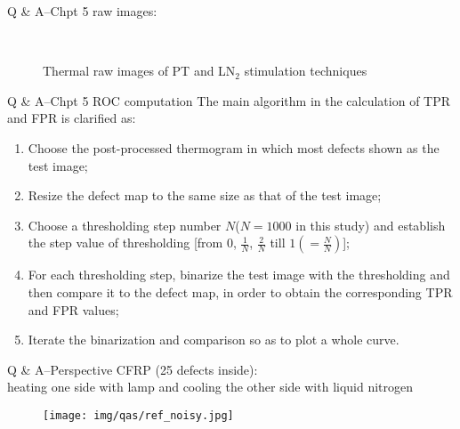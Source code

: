 \begin{frame}{Q \& A--Chpt 5 \small{raw images:}}
    \begin{figure}
     \vspace{-18pt}
       \\
       \vspace*{-10pt}
       \caption{Thermal raw images of PT and LN$_2$ stimulation techniques}      
    \end{figure}
\end{frame}


\begin{frame}{Q \& A--Chpt 5 \small{ROC computation}}
The main algorithm in the calculation of TPR and FPR is clarified as:
\begin{enumerate}
   \item Choose the post-processed thermogram in which most defects shown as the test image;
   \item Resize the defect map to the same size as that of the test image;
   \item Choose a thresholding step number $N$($N=1000$ in this study) and establish the step value of thresholding [from $0$, $\frac{1}{N}$, $\frac{2}{N}$ till $1 (=\frac{N}{N})$];
   \item For each thresholding step, binarize the test image with the thresholding and then compare it to the defect map, in order to obtain the corresponding TPR and FPR values;
   \item Iterate the binarization and comparison so as to plot a whole curve.
\end{enumerate}
\end{frame}


\begin{frame}{Q \& A--\small{Perspective}}
CFRP (25 defects inside):\\
heating one side with lamp and cooling the other side with liquid nitrogen 
  \begin{figure}
    \centering
    \texttt{[image: img/qas/ref\_noisy.jpg]}
  \end{figure}

\end{frame}
